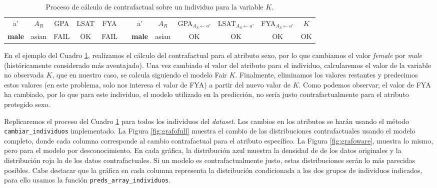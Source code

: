 \documentclass[oneside,openright,titlepage,numbers=noenddot,openany,headinclude,footinclude=true,
cleardoublepage=empty,abstractoff,BCOR=5mm,paper=a4,fontsize=12pt,main=spanish]{scrreprt}
\begin{document}
\begin{table}[h]
{\begin{tabular}{ccccclcccccc}
\multicolumn{1}{|c|}{a'} & \multicolumn{1}{c|}{$A_R$}             & \multicolumn{1}{c|}{GPA}                         & \multicolumn{1}{c|}{LSAT}                      & \multicolumn{1}{c|}{FYA}                         & \multicolumn{1}{c|}{}          & \multicolumn{1}{c|}{a'} & \multicolumn{1}{c|}{$A_R$}             & \multicolumn{1}{c|}{GPA$_{A_S\leftarrow a'}$}      & \multicolumn{1}{c|}{LSAT$_{A_S\leftarrow a'}$}    & \multicolumn{1}{c|}{FYA$_{A_S\leftarrow a'}$}      & \multicolumn{1}{c|}{$K$}                       \\ \cline{1-5} \cline{7-12} 
\multicolumn{1}{|c|}{\textbf{male}}  & \multicolumn{1}{c|}{asian} & \multicolumn{1}{c|}{{\color[HTML]{FE0000} FAIL}} & \multicolumn{1}{c|}{{\color[HTML]{32CB00} OK}} & \multicolumn{1}{c|}{{\color[HTML]{FE0000} FAIL}} & \multicolumn{1}{l|}{}          & \multicolumn{1}{c|}{\textbf{male}}  & \multicolumn{1}{c|}{asian} & \multicolumn{1}{c|}{{\color[HTML]{32CB00} OK}}   & \multicolumn{1}{c|}{{\color[HTML]{32CB00} OK}} & \multicolumn{1}{c|}{{\color[HTML]{32CB00} OK}}   & \multicolumn{1}{c|}{{\color[HTML]{32CB00} OK}} \\ \cline{1-5} \cline{7-12} 
\end{tabular}
}
\caption{Proceso de cálculo de contrafactual sobre un individuo para la variable $K$.}
\label{tab:procesocontrafact}
\end{table}

En el ejemplo del Cuadro \ref{tab:procesocontrafact}, realizamos el cálculo del contrafactual para el atributo sexo, por lo que cambiamos el valor \textit{female} por \textit{male} (históricamente considerado más aventajado). Una vez cambiado el valor del atributo para el individuo, calcularemos el valor de la variable no observada $K$, que en nuestro caso, se calcula siguiendo el modelo Fair $K$. Finalmente, eliminamos los valores restantes y predecimos estos valores (en este problema, solo nos interesa el valor de FYA) a partir del nuevo valor de $K$. Como podemos observar; el valor de FYA ha cambiado, por lo que para este individuo, el modelo utilizado en la predicción, no sería justo contrafactualmente para el atributo protegido sexo.

\clearpage

Replicaremos el proceso del Cuadro \ref{tab:procesocontrafact} para todos los individuos del \textit{dataset}. Los cambios en los atributos se harán usando el método \texttt{cambiar\_individuos} implementado. La Figura \ref{fig:grafofull} muestra el cambio de las distribuciones contrafactuales usando el modelo completo, donde cada columna corresponde al cambio contrafactual para el atributo específico. La Figura \ref{fig:grafoware}, muestra lo mismo, pero para el modelo por desconocimiento. En cada gráfica, la distribución azul muestra la densidad de de los datos originales y la distribución roja la de los datos contrafactuales. Si un modelo es contrafactualmente justo, estas distribuciones serán lo más parecidas posibles. Cabe destacar que la gráfica en cada columna representa la distribución condicionada a los dos grupos de individuos indicados, para ello usamos la función \texttt{preds\_array\_individuos}.\\
\end{document}
